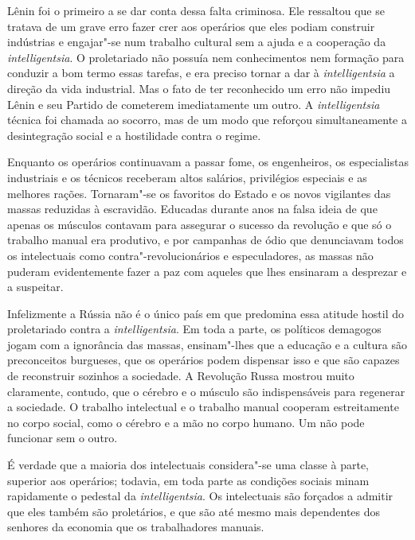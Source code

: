 Lênin foi o primeiro a se dar conta dessa falta criminosa. Ele ressaltou
que se tratava de um grave erro fazer crer aos operários que eles
podiam construir indústrias e engajar"-se num trabalho cultural sem a
ajuda e a cooperação da \textit{intelligentsia}. O proletariado não possuía nem
conhecimentos nem formação para conduzir a bom termo essas
tarefas, e era preciso tornar a dar à \textit{intelligentsia} a direção da vida
industrial. Mas o fato de ter reconhecido um erro não impediu Lênin e
seu Partido de cometerem imediatamente um outro. A \textit{intelligentsia}
técnica foi chamada ao socorro, mas de um modo que reforçou
simultaneamente a desintegração social e a hostilidade contra o regime.

Enquanto os operários continuavam a passar fome, os engenheiros, os
especialistas industriais e os técnicos receberam altos salários,
privilégios especiais e as melhores rações. Tornaram"-se os favoritos
do Estado e os novos vigilantes das massas reduzidas à escravidão.
Educadas durante anos na falsa ideia de que apenas os músculos contavam
para assegurar o sucesso da revolução e que só o trabalho manual era
produtivo, e por campanhas de ódio que denunciavam todos os
intelectuais como contra"-revolucionários e especuladores, as massas
não puderam evidentemente fazer a paz com aqueles que lhes ensinaram a
desprezar e a suspeitar.

Infelizmente a Rússia não é o único país em que predomina essa atitude
hostil do proletariado contra a \textit{intelligentsia}. Em toda a parte, os
políticos demagogos jogam com a ignorância das massas, ensinam"-lhes
que a educação e a cultura são preconceitos burgueses, que os operários
podem dispensar isso e que são capazes de reconstruir sozinhos a
sociedade. A Revolução Russa mostrou muito claramente, contudo, que o
cérebro e o músculo são indispensáveis para regenerar a sociedade. O
trabalho intelectual e o trabalho manual cooperam estreitamente no
corpo social, como o cérebro e a mão no corpo humano. Um não pode
funcionar sem o outro.

É verdade que a maioria dos intelectuais considera"-se uma classe
à parte, superior aos operários; todavia, em toda parte as condições
sociais minam rapidamente o pedestal da \textit{intelligentsia}. Os intelectuais
são forçados a admitir que eles também são proletários, e que são até
mesmo mais dependentes dos senhores da economia que os trabalhadores
manuais.

